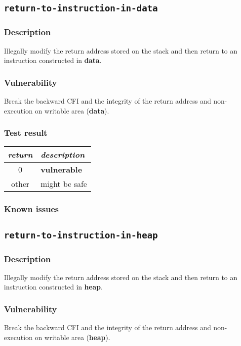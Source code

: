 \documentclass[a4paper]{book}
\begin{document}
\subsection{\texttt{return-to-instruction-in-data}}\label{test-return-to-instruction-in-data}

\subsubsection{Description}
Illegally modify the return address stored on the stack and then return to  an instruction constructed in \textbf{data}.

\subsubsection{Vulnerability}
Break the backward CFI and the integrity of the return address and non-execution on writable area (\textbf{data}).

\subsubsection{Test result}
\begin{tabular}{cl}
  \toprule
  \emph{return}  & \emph{description} \\
  \midrule
  0              & \textbf{vulnerable} \\
  other          & might be safe \\
  \bottomrule
\end{tabular}
  
\subsubsection{Known issues}

\newpage
\subsection{\texttt{return-to-instruction-in-heap}}\label{test-return-to-instruction-in-heap}

\subsubsection{Description}
Illegally modify the return address stored on the stack and then return to  an instruction constructed in \textbf{heap}.

\subsubsection{Vulnerability}
Break the backward CFI and the integrity of the return address and non-execution on writable area (\textbf{heap}).
\end{document}
